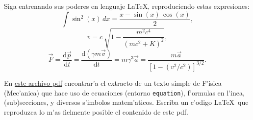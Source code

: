 \documentclass[11pt]{exam}
\begin{document}
\begin{questions}
\item Siga entrenando sus poderes en lenguaje \LaTeX, reproduciendo estas expresiones:
\begin{equation}
\int \sin^2(x)\,dx=\frac{x-\sin (x)\,\cos (x)}{2}  ,
\end{equation}
\begin{equation}
v = c \ \sqrt{1- \frac{{m^2 c^4}}{{(mc^2+K)^2}}},
\end{equation}
\begin{equation}
\vec{F} = \frac{\text{d}\vec{p}}{\text{d}t} = \frac{\text{d}(\gamma m \vec{v})}{\text{d}t} = m \gamma^3 \vec{a} = \frac{m \vec{a}}{[1-(v^2/c^2)]^{3/2}}.
\end{equation}


\item En \href{https://github.com/gfrubi/CC/blob/master/guias/04/ejemplo-g4.pdf}{este archivo pdf} encontrar'a el extracto de un texto simple de F'isica (Mec'anica) que hace uso de ecuaciones (entorno \texttt{equation}), f'ormulas en l'inea, (sub)secciones, y diversos s'imbolos matem'aticos. Escriba un c'odigo \LaTeX\ que reproduzca lo m'as fielmente posible el contenido de este pdf.
\end{questions}
\end{document}

